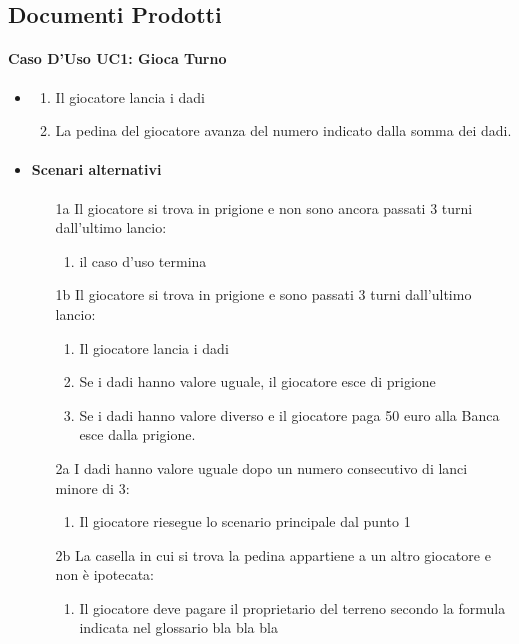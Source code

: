 \documentclass{article}
\begin{document}
\subsection{Documenti Prodotti}
\paragraph{\large Caso D'Uso UC1: Gioca Turno}
\begin{itemize}
\item
\begin{enumerate}
    \item Il giocatore lancia i dadi
    \item La pedina del giocatore avanza del numero indicato dalla somma dei dadi.
\end{enumerate}
\item
\paragraph{\large Scenari alternativi}
\begin{enumerate}
    \item [1a] Il giocatore si trova in prigione e non sono ancora passati 3 turni dall'ultimo lancio:
    \begin{enumerate}
        \item il caso d'uso termina
    \end{enumerate}
    \item [1b] Il giocatore si trova in prigione e sono passati 3 turni dall'ultimo lancio:
        \begin{enumerate}
            \item Il giocatore lancia i dadi
            \item Se i dadi hanno valore uguale, il giocatore esce di prigione
            \item Se i dadi hanno valore diverso e il giocatore paga 50 euro alla Banca esce dalla prigione.
        \end{enumerate}
    \item [2a] I dadi hanno valore uguale dopo un numero consecutivo di lanci minore di 3:
    \begin{enumerate}
        \item Il giocatore riesegue lo scenario principale dal punto 1
    \end{enumerate}
    \item [2b] La casella in cui si trova la pedina appartiene a un altro giocatore e non è ipotecata:
    \begin{enumerate}
        \item Il giocatore deve pagare il proprietario del terreno secondo la formula indicata nel glossario bla bla bla
    \end{enumerate}
    

\end{enumerate}
\end{itemize}
\end{document}
